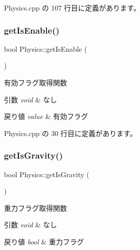  Physics.\+cpp の 107 行目に定義があります。

\mbox{\label{class_physics_a9f7d1579ed7e0f97726ca7117f479c45}} 
\subsubsection{\texorpdfstring{get\+Is\+Enable()}{getIsEnable()}}
{\footnotesize\ttfamily bool Physics\+::get\+Is\+Enable (\begin{DoxyParamCaption}{ }\end{DoxyParamCaption})}



有効フラグ取得関数 


\begin{DoxyParams}{引数}
{\em void} & なし \\
\hline
\end{DoxyParams}

\begin{DoxyRetVals}{戻り値}
{\em value} & 有効フラグ \\
\hline
\end{DoxyRetVals}


 Physics.\+cpp の 30 行目に定義があります。

\mbox{\label{class_physics_a7a4f2372930e737b61a73b2a41067158}} 
\subsubsection{\texorpdfstring{get\+Is\+Gravity()}{getIsGravity()}}
{\footnotesize\ttfamily bool Physics\+::get\+Is\+Gravity (\begin{DoxyParamCaption}{ }\end{DoxyParamCaption})}



重力フラグ取得関数 


\begin{DoxyParams}{引数}
{\em void} & なし \\
\hline
\end{DoxyParams}

\begin{DoxyRetVals}{戻り値}
{\em bool} & 重力フラグ \\
\hline
\end{DoxyRetVals}



